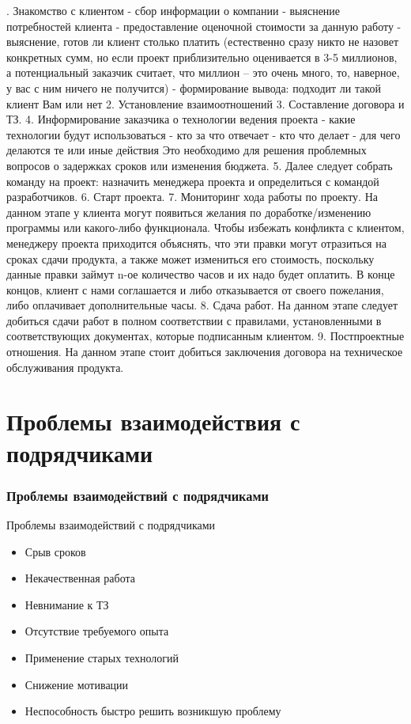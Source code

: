 \documentclass{../industrial-development}
\begin{document}
\begin{}
. Знакомство с клиентом
  - сбор информации о компании
  -  выяснение потребностей клиента
  - предоставление оценочной стоимости за данную работу
 -  выяснение, готов ли клиент столько платить (естественно сразу никто не назовет конкретных сумм, но если проект приблизительно оценивается в 3-5 миллионов, а потенциальный заказчик считает, что миллион –  это очень много, то, наверное, у вас с ним ничего не получится)
  - формирование вывода: подходит ли такой клиент Вам или нет
2. Установление взаимоотношений
3. Составление договора и ТЗ.
4. Информирование заказчика о технологии ведения проекта
 - какие технологии будут использоваться
 - кто за что отвечает
 - кто что делает
 - для чего делаются те или иные действия
 Это необходимо для решения проблемных вопросов о задержках сроков или изменения бюджета.
5. Далее следует собрать команду на проект: назначить менеджера проекта и определиться с командой разработчиков.
6. Старт проекта.
7. Мониторинг хода работы по проекту. 
На данном этапе у клиента могут появиться желания по доработке/изменению программы или какого-либо функционала. Чтобы избежать конфликта с клиентом, менеджеру проекта приходится объяснять, что эти правки могут отразиться на сроках сдачи продукта, а также может измениться его стоимость, поскольку данные правки займут n-ое количество часов и их надо будет оплатить. В конце концов, клиент с нами соглашается и либо отказывается от своего пожелания, либо оплачивает дополнительные часы. 
8. Сдача работ.
На данном этапе следует добиться сдачи работ в полном соответствии с правилами, установленными в соответствующих документах, которые подписанным клиентом.
9. Постпроектные отношения. 
На данном этапе стоит добиться заключения договора на техническое обслуживания продукта.

\section{Проблемы взаимодействия с подрядчиками}
\begin{frame} \frametitle{Проблемы взаимодействий с подрядчиками}
  \begin{block}{Проблемы взаимодействий с подрядчиками}
  \end{block}

\begin{itemize}
 \item Срыв сроков 
 \item Некачественная работа
 \item Невнимание к ТЗ
 \item Отсутствие требуемого опыта
 \item Применение старых технологий
 \item Снижение мотивации
 \item Неспособность быстро решить возникшую проблему
  \end{itemize}
\end{frame}


\end{}
\end{document}

